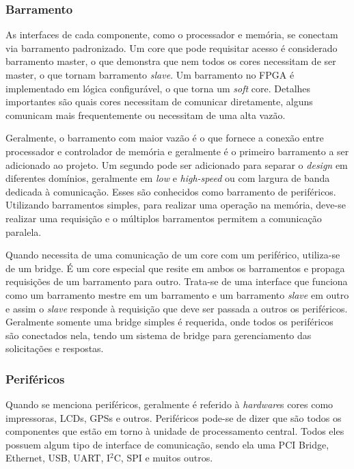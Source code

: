 \subsubsection{Barramento}



As interfaces de cada componente, como o processador e memória, se conectam via barramento padronizado. Um core que pode requisitar acesso é considerado barramento master, o que demonstra que nem todos os cores necessitam de ser master, o que tornam barramento \textit{slave}. Um barramento no FPGA é implementado em lógica configurável, o que torna um \textit{soft} core. Detalhes importantes são quais cores necessitam de comunicar diretamente, alguns comunicam mais frequentemente ou necessitam de uma alta vazão.

Geralmente, o barramento com maior vazão é o que fornece a conexão entre processador e controlador de memória e geralmente é o primeiro barramento a ser adicionado ao projeto. Um segundo pode ser adicionado para separar o \textit{design} em diferentes domínios, geralmente em \textit{low} e \textit{high-speed} ou com largura de banda dedicada à comunicação. Esses são conhecidos como barramento de periféricos. Utilizando barramentos simples, para realizar uma operação na memória, deve-se realizar uma requisição e o múltiplos barramentos permitem a comunicação paralela.

Quando necessita de uma comunicação de um core com um periférico, utiliza-se de um bridge. É um core especial que resite em ambos os barramentos e propaga requisições de um barramento para outro. Trata-se de uma interface que funciona como um barramento mestre em um barramento e um barramento \textit{\textit{slave}} em outro e assim o \textit{\textit{slave}} responde à requisição que deve ser passada a outros os periféricos. Geralmente somente uma bridge simples é requerida, onde todos os periféricos são conectados nela, tendo um sistema de bridge para gerenciamento das solicitações e respostas.





\subsubsection{Periféricos}



Quando se menciona periféricos, geralmente é referido à \textit{hardware}s cores como impressoras, LCDs, GPSs e outros. Periféricos pode-se de dizer que são todos os componentes que estão em torno à unidade de processamento central. Todos eles possuem algum tipo de interface de comunicação, sendo ela uma PCI Bridge, Ethernet, USB, UART, I$^2$C, SPI e muitos outros.







